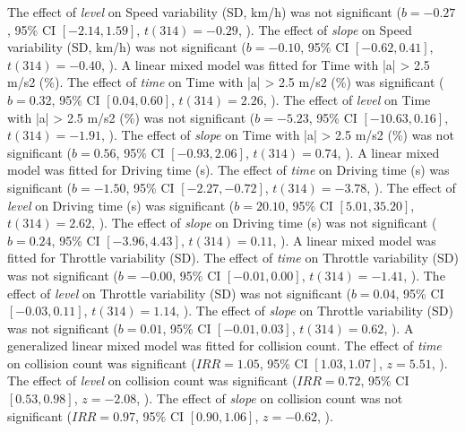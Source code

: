 The effect of \textit{level} on Speed variability (SD, km/h) was not significant ($b = -0.27$, 95\% CI $[-2.14, 1.59]$, $t(314) = -0.29$, ).
The effect of \textit{slope} on Speed variability (SD, km/h) was not significant ($b = -0.10$, 95\% CI $[-0.62, 0.41]$, $t(314) = -0.40$, ).
A linear mixed model was fitted for Time with |a| \textgreater{} 2.5 m/s2 (\%).
The effect of \textit{time} on Time with |a| \textgreater{} 2.5 m/s2 (\%) was significant ($b = 0.32$, 95\% CI $[0.04, 0.60]$, $t(314) = 2.26$, ).
The effect of \textit{level} on Time with |a| \textgreater{} 2.5 m/s2 (\%) was not significant ($b = -5.23$, 95\% CI $[-10.63, 0.16]$, $t(314) = -1.91$, ).
The effect of \textit{slope} on Time with |a| \textgreater{} 2.5 m/s2 (\%) was not significant ($b = 0.56$, 95\% CI $[-0.93, 2.06]$, $t(314) = 0.74$, ).
A linear mixed model was fitted for Driving time (s).
The effect of \textit{time} on Driving time (s) was significant ($b = -1.50$, 95\% CI $[-2.27, -0.72]$, $t(314) = -3.78$, ).
The effect of \textit{level} on Driving time (s) was significant ($b = 20.10$, 95\% CI $[5.01, 35.20]$, $t(314) = 2.62$, ).
The effect of \textit{slope} on Driving time (s) was not significant ($b = 0.24$, 95\% CI $[-3.96, 4.43]$, $t(314) = 0.11$, ).
A linear mixed model was fitted for Throttle variability (SD).
The effect of \textit{time} on Throttle variability (SD) was not significant ($b = -0.00$, 95\% CI $[-0.01, 0.00]$, $t(314) = -1.41$, ).
The effect of \textit{level} on Throttle variability (SD) was not significant ($b = 0.04$, 95\% CI $[-0.03, 0.11]$, $t(314) = 1.14$, ).
The effect of \textit{slope} on Throttle variability (SD) was not significant ($b = 0.01$, 95\% CI $[-0.01, 0.03]$, $t(314) = 0.62$, ).
A generalized linear mixed model was fitted for collision count.
The effect of \textit{time} on collision count was significant ($IRR = 1.05$, 95\% CI $[1.03, 1.07]$, $z = 5.51$, ).
The effect of \textit{level} on collision count was significant ($IRR = 0.72$, 95\% CI $[0.53, 0.98]$, $z = -2.08$, ).
The effect of \textit{slope} on collision count was not significant ($IRR = 0.97$, 95\% CI $[0.90, 1.06]$, $z = -0.62$, ).
